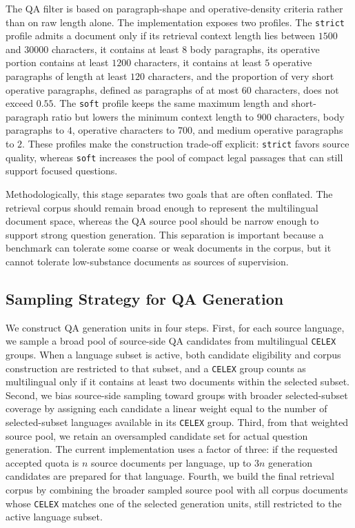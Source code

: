 The QA filter is based on paragraph-shape and operative-density criteria rather than on raw length alone. The implementation exposes two profiles. The \texttt{strict} profile admits a document only if its retrieval context length lies between \(1500\) and \(30000\) characters, it contains at least \(8\) body paragraphs, its operative portion contains at least \(1200\) characters, it contains at least \(5\) operative paragraphs of length at least \(120\) characters, and the proportion of very short operative paragraphs, defined as paragraphs of at most \(60\) characters, does not exceed \(0.55\). The \texttt{soft} profile keeps the same maximum length and short-paragraph ratio but lowers the minimum context length to \(900\) characters, body paragraphs to \(4\), operative characters to \(700\), and medium operative paragraphs to \(2\). These profiles make the construction trade-off explicit: \texttt{strict} favors source quality, whereas \texttt{soft} increases the pool of compact legal passages that can still support focused questions.

Methodologically, this stage separates two goals that are often conflated. The retrieval corpus should remain broad enough to represent the multilingual document space, whereas the QA source pool should be narrow enough to support strong question generation. This separation is important because a benchmark can tolerate some coarse or weak documents in the corpus, but it cannot tolerate low-substance documents as sources of supervision.

\subsection{Sampling Strategy for QA Generation}

We construct QA generation units in four steps. First, for each source language, we sample a broad pool of source-side QA candidates from multilingual \texttt{CELEX} groups. When a language subset is active, both candidate eligibility and corpus construction are restricted to that subset, and a \texttt{CELEX} group counts as multilingual only if it contains at least two documents within the selected subset. Second, we bias source-side sampling toward groups with broader selected-subset coverage by assigning each candidate a linear weight equal to the number of selected-subset languages available in its \texttt{CELEX} group. Third, from that weighted source pool, we retain an oversampled candidate set for actual question generation. The current implementation uses a factor of three: if the requested accepted quota is \(n\) source documents per language, up to \(3n\) generation candidates are prepared for that language. Fourth, we build the final retrieval corpus by combining the broader sampled source pool with all corpus documents whose \texttt{CELEX} matches one of the selected generation units, still restricted to the active language subset.

